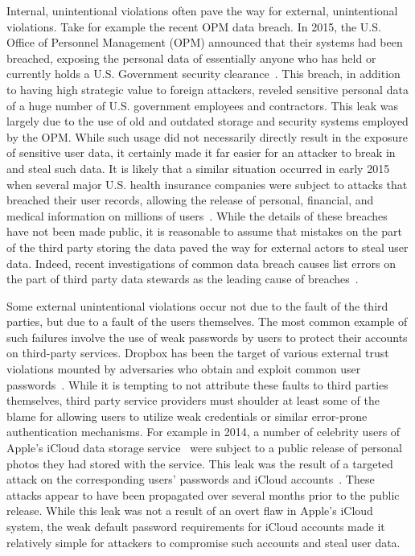 Internal, unintentional violations often pave the way for external,
unintentional violations. Take for example the recent OPM data
breach. In 2015, the U.S. Office of Personnel Management (OPM)
announced that their systems had been breached, exposing the personal
data of essentially anyone who has held or currently holds a
U.S. Government security clearance~\cite{ars-opmhack,
  opm-cybersecurityincidents}. This breach, in addition to having high
strategic value to foreign attackers, reveled sensitive personal data
of a huge number of U.S. government employees and contractors. This
leak was largely due to the use of old and outdated storage and
security systems employed by the OPM. While such usage did not
necessarily directly result in the exposure of sensitive user data, it
certainly made it far easier for an attacker to break in and steal
such data. It is likely that a similar situation occurred in early
2015 when several major U.S. health insurance companies were subject
to attacks that breached their user records, allowing the release of
personal, financial, and medical information on millions of
users~\cite{krebs-anthem, krebs-premera}. While the details of these
breaches have not been made public, it is reasonable to assume that
mistakes on the part of the third party storing the data paved the way
for external actors to steal user data. Indeed, recent investigations
of common data breach causes list errors on the part of third party
data stewards as the leading cause of breaches~\cite{gallagher-blame,
  verizon-2016breach}.

Some external unintentional violations occur not due to the fault of
the third parties, but due to a fault of the users themselves. The
most common example of such failures involve the use of weak passwords
by users to protect their accounts on third-party services.  Dropbox
has been the target of various external trust violations mounted by
adversaries who obtain and exploit common user
passwords~\cite{dropbox-passwords}. While it is tempting to not
attribute these faults to third parties themselves, third party
service providers must shoulder at least some of the blame for
allowing users to utilize weak credentials or similar error-prone
authentication mechanisms. For example in 2014, a number of celebrity
users of Apple's iCloud data storage service~\cite{apple-icloud} were
subject to a public release of personal photos they had stored with
the service. This leak was the result of a targeted attack on the
corresponding users' passwords and iCloud
accounts~\cite{apple-icloudleak}. These attacks appear to have been
propagated over several months prior to the public release. While this
leak was not a result of an overt flaw in Apple's iCloud system, the
weak default password requirements for iCloud accounts made it
relatively simple for attackers to compromise such accounts and steal
user data.

